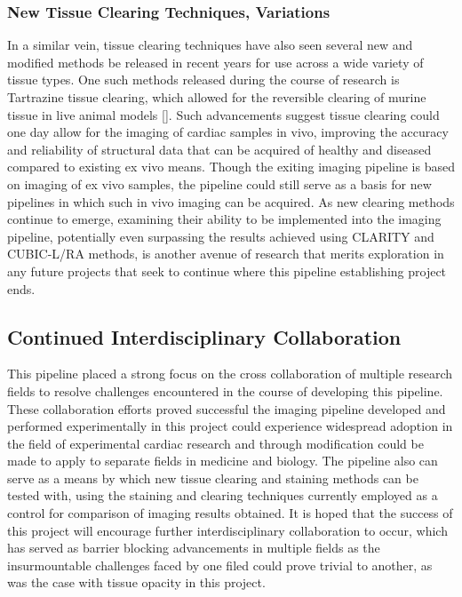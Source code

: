 \subsubsection{New Tissue Clearing Techniques, Variations}
In a similar vein, tissue clearing techniques have also seen several new and modified methods be released in recent years for use across a wide variety of tissue types. One such methods released during the course of research is Tartrazine tissue clearing, which allowed for the reversible clearing of murine tissue in live animal models []. Such advancements suggest tissue clearing could one day allow for the imaging of cardiac samples in vivo, improving the accuracy and reliability of structural data that can be acquired of healthy and diseased compared to existing ex vivo means. Though the exiting imaging pipeline is based on imaging of ex vivo samples, the pipeline could still serve as a basis for new pipelines in which such in vivo imaging can be acquired. As new clearing methods continue to emerge, examining their ability to be implemented into the imaging pipeline, potentially even surpassing the results achieved using CLARITY and CUBIC-L/RA methods, is another avenue of research that merits exploration in any future projects that seek to continue where this pipeline establishing project ends. 

\subsection{Continued Interdisciplinary Collaboration}
This pipeline placed a strong focus on the cross collaboration of multiple research fields to resolve challenges encountered in the course of developing this pipeline. These collaboration efforts proved successful the imaging pipeline developed and performed experimentally in this project could experience widespread adoption in the field of experimental cardiac research and through modification could be made to apply to separate fields in medicine and biology. The pipeline also can serve as a means by which new tissue clearing and staining methods can be tested with, using the staining and clearing techniques currently employed as a control for comparison of imaging results obtained. It is hoped that the success of this project will encourage further interdisciplinary collaboration to occur, which has served as barrier blocking advancements in multiple fields as the insurmountable challenges faced by one filed could prove trivial to another, as was the case with tissue opacity in this project. 

